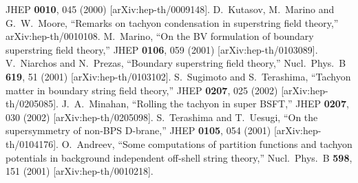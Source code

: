 \documentclass[12pt,a4paper]{article}
\begin{document}
\begin{thebibliography}{99}
JHEP {\bf 0010}, 045 (2000)
[arXiv:hep-th/0009148].
D.~Kutasov, M.~Marino and G.~W.~Moore,
``Remarks on tachyon condensation in superstring field theory,''
arXiv:hep-th/0010108.
M.~Marino,
``On the BV formulation of boundary superstring field theory,''
JHEP {\bf 0106}, 059 (2001)
[arXiv:hep-th/0103089].
V.~Niarchos and N.~Prezas,
``Boundary superstring field theory,''
Nucl.\ Phys.\ B {\bf 619}, 51 (2001)
[arXiv:hep-th/0103102].
S.~Sugimoto and S.~Terashima,
``Tachyon matter in boundary string field theory,''
JHEP {\bf 0207}, 025 (2002)
[arXiv:hep-th/0205085].
J.~A.~Minahan,
``Rolling the tachyon in super BSFT,''
JHEP {\bf 0207}, 030 (2002)
[arXiv:hep-th/0205098].
S.~Terashima and T.~Uesugi,
``On the supersymmetry of non-BPS D-brane,''
JHEP {\bf 0105}, 054 (2001)
[arXiv:hep-th/0104176].
O.~Andreev,
``Some computations of partition functions and tachyon potentials in
background independent off-shell string theory,''
Nucl.\ Phys.\ B {\bf 598}, 151 (2001)
[arXiv:hep-th/0010218].
\end{thebibliography}
\end{document}
